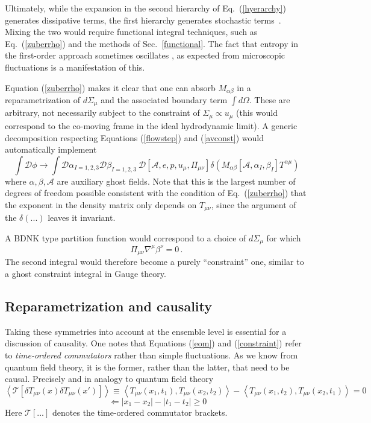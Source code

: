 \documentclass[12pt,onecolumn,showpacs,amssymb,aps,nofootinbib,floatfix]{revtex4-2}
\newcommand{\ave}[1]{\left\langle #1 \right\rangle}
\renewcommand{\eqref}[1]{Eq.~(\ref{#1})}
\newcommand{\tcomm}[1]{\mathcal{T}\left[ #1\right]}
\begin{document}
	Ultimately, while the expansion in the second hierarchy of \eqref{hyerarchy} generates dissipative terms, the first hierarchy generates stochastic terms~\cite{crooks}. Mixing the two would require functional integral techniques, such as \eqref{zuberrho} and the methods of Sec.~\ref{functional}. The fact that entropy in the first-order approach sometimes oscillates \cite{gavassino}, as expected from microscopic fluctuations \cite{crooks} is a manifestation of this.
	
	Equation (\ref{zuberrho}) makes it clear that one can absorb $M_{\alpha \beta}$ in a reparametrization of $d\Sigma_\mu$ and the associated boundary term $\int d\Omega$. These are arbitrary, not necessarily subject to the constraint of $\Sigma_\mu \propto u_\mu$ (this would correspond to the co-moving frame in the ideal hydrodynamic limit).
	A generic decomposition respecting Equations (\ref{flowstep}) and (\ref{avconst}) would automatically implement
	\begin{equation}
		\label{intconst}
		\int \mathcal{D}\phi \rightarrow \int \mathcal{D} \alpha_{I=1,2,3} \mathcal{D} \beta_{I=1,2,3} \  \mathcal{D}\left[ \mathcal{A},e,p,u_\mu,\Pi_{\mu \nu}\right]  \delta\left( M_{\alpha \beta}\left[\mathcal{A},\alpha_I,\beta_I  \right] T^{\alpha \mu} \right)
	\end{equation}
	where $\alpha,\beta,\mathcal{A}$ are auxiliary ghost fields.   Note that this is the largest number of degrees of freedom possible consistent with the condition of \eqref{zuberrho} that the exponent in the density matrix only depends on $T_{\mu \nu}$, since the argument of the $\delta(...)$ leaves it invariant.
	
	A BDNK type partition function would correspond to a choice of $d\Sigma_{\mu}$ for which 
	\[
	\Pi_{\mu \nu}  \nabla^\mu \beta^\nu=0\,.
	\]
	The second integral would therefore become a purely ``constraint'' one, similar to a ghost constraint integral in Gauge theory.
	\subsection{Reparametrization and causality \label{repcause}}
	Taking these symmetries into account at the ensemble level is essential for a discussion of causality. One notes that Equations (\ref{eom}) and (\ref{constraint}) refer to {\em time-ordered commutators} rather than simple fluctuations. As we know from quantum field theory, it is the former, rather than the latter, that need to be causal. Precisely and in analogy to quantum field theory
	\begin{equation}
		\label{causalcond}
		\ave{\tcomm{ \delta T_{\mu \nu}(x)\delta T_{\mu \nu}(x')}}\equiv \ave{T_{\mu \nu}(x_1,t_1),T_{\mu \nu}(x_2,t_2)}- \ave{T_{\mu \nu}(x_1,t_2),T_{\mu \nu}(x_2,t_1)}=0
	\end{equation}
	\[\   \Leftarrow |x_1-x_2|-|t_1-t_2|\geq 0 \]
	Here $\tcomm{...}$ denotes the time-ordered commutator brackets.
	
\end{document}
